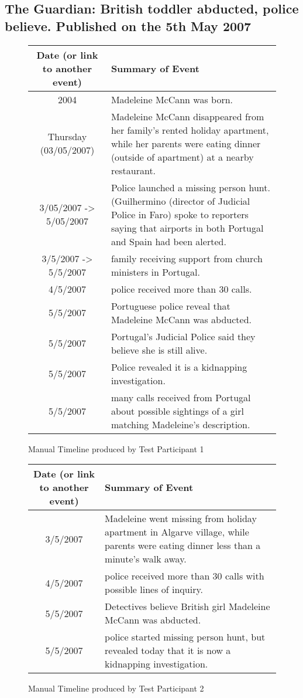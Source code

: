 \subsection{The Guardian: British toddler abducted, police believe. Published on the 5th May 2007}
\begin{figure}[H]
\begin{tabular}{|c|p{7cm}|}
\hline
Date (or link to another event) & Summary of Event\\
\hline
\hline
2004 & Madeleine McCann was born.\\
\hline
Thursday (03/05/2007) & Madeleine McCann disappeared from her family's rented holiday apartment, while her parents were eating dinner (outside of apartment) at a nearby restaurant.\\
\hline
3/05/2007 -> 5/05/2007 & Police launched a missing person hunt. (Guilhermino (director of Judicial Police in Faro) spoke to reporters saying that airports in both Portugal and Spain had been alerted.\\
\hline
3/5/2007 -> 5/5/2007 & family receiving support from church ministers in Portugal.\\
\hline
4/5/2007 & police received more than 30 calls.\\
\hline
5/5/2007 & Portuguese police reveal that Madeleine McCann was abducted.\\
\hline
5/5/2007 & Portugal's Judicial Police said they believe she is still alive.\\
\hline
5/5/2007 & Police revealed it is a kidnapping investigation.\\
\hline
5/5/2007 & many calls received from Portugal about possible sightings of a girl matching Madeleine's description.\\
\hline
\end{tabular}
\caption{Manual Timeline produced by Test Participant 1}
\end{figure}

\begin{figure}[H]
\begin{tabular}{|c|p{7cm}|}
\hline
Date (or link to another event) & Summary of Event\\
\hline
\hline
3/5/2007 & Madeleine went missing from holiday apartment in Algarve village, while parents were eating dinner less than a minute's walk away.\\
\hline
4/5/2007 & police received more than 30 calls  with possible lines of inquiry.\\
\hline
5/5/2007 & Detectives believe British girl Madeleine McCann was abducted.\\
\hline
5/5/2007 & police started missing person hunt, but revealed today that it is now a kidnapping investigation.\\
\hline
\end{tabular}
\caption{Manual Timeline produced by Test Participant 2}
\end{figure}


